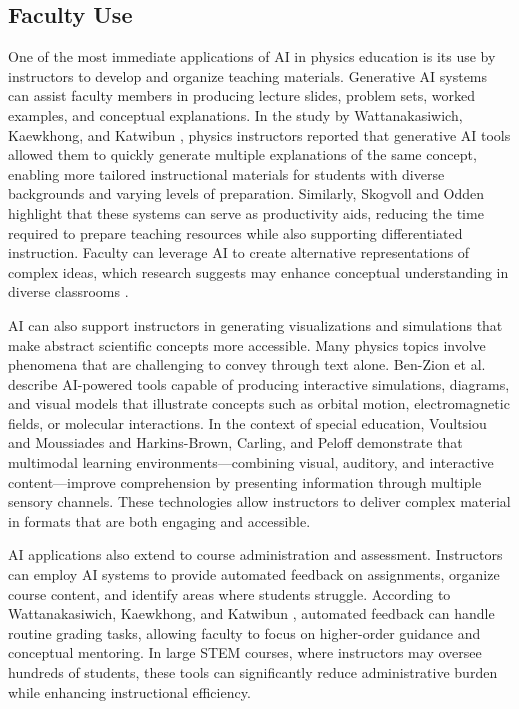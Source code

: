 \documentclass[]{aastex701}
\begin{document}
\subsection{Faculty Use}

One of the most immediate applications of AI in physics education is its use by instructors to develop and organize teaching materials. Generative AI systems can assist faculty members in producing lecture slides, problem sets, worked examples, and conceptual explanations. In the study by Wattanakasiwich, Kaewkhong, and Katwibun \autocite{Wattanakasiwich2025}, physics instructors reported that generative AI tools allowed them to quickly generate multiple explanations of the same concept, enabling more tailored instructional materials for students with diverse backgrounds and varying levels of preparation. Similarly, Skogvoll and Odden \autocite{Skogvoll2025} highlight that these systems can serve as productivity aids, reducing the time required to prepare teaching resources while also supporting differentiated instruction. Faculty can leverage AI to create alternative representations of complex ideas, which research suggests may enhance conceptual understanding in diverse classrooms \autocite{Wattanakasiwich2025, Skogvoll2025}.

AI can also support instructors in generating visualizations and simulations that make abstract scientific concepts more accessible. Many physics topics involve phenomena that are challenging to convey through text alone. Ben-Zion et al.\ \autocite{BenZion2025} describe AI-powered tools capable of producing interactive simulations, diagrams, and visual models that illustrate concepts such as orbital motion, electromagnetic fields, or molecular interactions. In the context of special education, Voultsiou and Moussiades \autocite{Voultsiou2025} and Harkins-Brown, Carling, and Peloff \autocite{HarkinsBrown2025} demonstrate that multimodal learning environments---combining visual, auditory, and interactive content---improve comprehension by presenting information through multiple sensory channels. These technologies allow instructors to deliver complex material in formats that are both engaging and accessible.

AI applications also extend to course administration and assessment. Instructors can employ AI systems to provide automated feedback on assignments, organize course content, and identify areas where students struggle. According to Wattanakasiwich, Kaewkhong, and Katwibun \autocite{Wattanakasiwich2025}, automated feedback can handle routine grading tasks, allowing faculty to focus on higher-order guidance and conceptual mentoring. In large STEM courses, where instructors may oversee hundreds of students, these tools can significantly reduce administrative burden while enhancing instructional efficiency.
\end{document}
